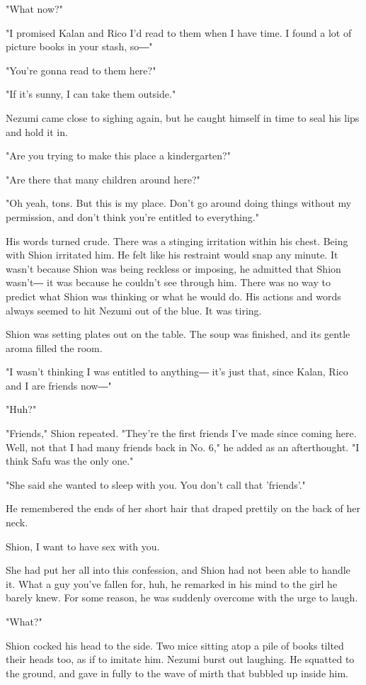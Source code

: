 "What now?"

"I promised Kalan and Rico I'd read to them when I have time. I found a
lot of picture books in your stash, so―"

"You're gonna read to them here?"

"If it's sunny, I can take them outside."

Nezumi came close to sighing again, but he caught himself in time to
seal his lips and hold it in.

"Are you trying to make this place a kindergarten?"

"Are there that many children around here?"

"Oh yeah, tons. But this is my place. Don't go around doing things
without my permission, and don't think you're entitled to everything."

His words turned crude. There was a stinging irritation within his
chest. Being with Shion irritated him. He felt like his restraint would
snap any minute. It wasn't because Shion was being reckless or imposing,
he admitted that Shion wasn't― it was because he couldn't see through
him. There was no way to predict what Shion was thinking or what he
would do. His actions and words always seemed to hit Nezumi out of the
blue. It was tiring.

Shion was setting plates out on the table. The soup was finished, and
its gentle aroma filled the room.

"I wasn't thinking I was entitled to anything― it's just that, since
Kalan, Rico and I are friends now―"

"Huh?"

"Friends," Shion repeated. "They're the first friends I've made since
coming here. Well, not that I had many friends back in No. 6," he added
as an afterthought. "I think Safu was the only one."

"She said she wanted to sleep with you. You don't call that 'friends'."

He remembered the ends of her short hair that draped prettily on the
back of her neck.

Shion, I want to have sex with you.

She had put her all into this confession, and Shion had not been able to
handle it. What a guy you've fallen for, huh, he remarked in his mind to
the girl he barely knew. For some reason, he was suddenly overcome with
the urge to laugh.

"What?"

Shion cocked his head to the side. Two mice sitting atop a pile of books
tilted their heads too, as if to imitate him. Nezumi burst out laughing.
He squatted to the ground, and gave in fully to the wave of mirth that
bubbled up inside him.

